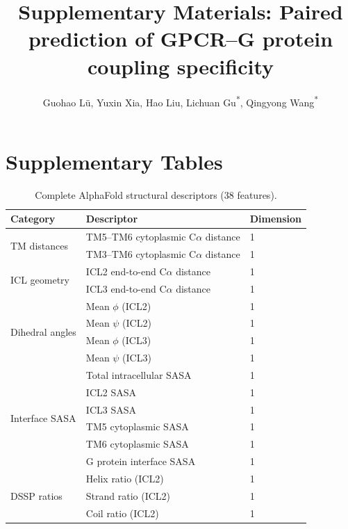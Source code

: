 \documentclass[11pt,a4paper]{article}
\title{\Large \bfseries Supplementary Materials: Paired prediction of GPCR--G protein coupling specificity}
\author{Guohao L\"{u}, Yuxin Xia, Hao Liu, Lichuan Gu\textsuperscript{*}, Qingyong Wang\textsuperscript{*}}
\date{}
\begin{document}
\maketitle

\section{Supplementary Tables}

\begin{table}[h!]
\centering
\caption{Complete AlphaFold structural descriptors (38 features).}
\label{tab:alphafold_features}
\begin{tabular}{lll}
\toprule
Category & Descriptor & Dimension \\
\midrule
\multirow{2}{*}{TM distances} & TM5--TM6 cytoplasmic C$\alpha$ distance & 1 \\
                              & TM3--TM6 cytoplasmic C$\alpha$ distance & 1 \\
\midrule
\multirow{2}{*}{ICL geometry} & ICL2 end-to-end C$\alpha$ distance & 1 \\
                              & ICL3 end-to-end C$\alpha$ distance & 1 \\
\midrule
\multirow{4}{*}{Dihedral angles} & Mean $\phi$ (ICL2) & 1 \\
                                 & Mean $\psi$ (ICL2) & 1 \\
                                 & Mean $\phi$ (ICL3) & 1 \\
                                 & Mean $\psi$ (ICL3) & 1 \\
\midrule
\multirow{6}{*}{Interface SASA} & Total intracellular SASA & 1 \\
                                & ICL2 SASA & 1 \\
                                & ICL3 SASA & 1 \\
                                & TM5 cytoplasmic SASA & 1 \\
                                & TM6 cytoplasmic SASA & 1 \\
                                & G protein interface SASA & 1 \\
\midrule
\multirow{6}{*}{DSSP ratios} & Helix ratio (ICL2) & 1 \\
                             & Strand ratio (ICL2) & 1 \\
                             & Coil ratio (ICL2) & 1 \\

\end{tabular}
\end{table}
\end{document}
